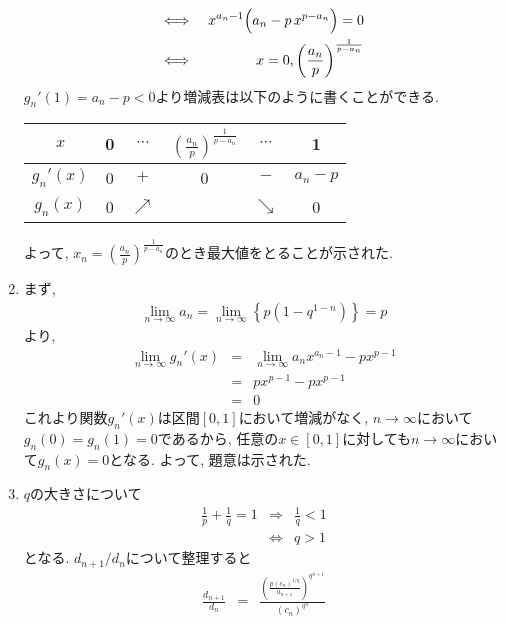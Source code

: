 \documentclass[dvipdfmx,titlepage, 11pt, a4paper]{jsarticle}%
\begin{document}
\begin{enumerate}[(1)]
\begin{eqnarray*}
		      \Longleftrightarrow\ && x^{a_{n}-1}\Bigl(a_{n}-p\,x^{p-a_{n}}\Bigr)=0\\
		      \Longleftrightarrow\ && x=0,\left(\frac{a_{n}}{p}\right)^{\frac{1}{p-a_{n}}}
	      \end{eqnarray*}
	      $g_{n}'(1)=a_{n}-p<0$より増減表は以下のように書くことができる.
	      \begin{center}
		      \begin{tabular}{|c|c||c|c|c|c|}\hline
			      $x$         & 0 & $\cdots$   & $\displaystyle \left(\frac{a_{n}}{p}\right)^{\frac{1}{p-a_{n}}}$ & $\cdots$   & 1         \\ \hline
			      $g_{n}'(x)$ & 0 & $+$        & 0                                                                & $-$        & $a_{n}-p$ \\ \hline
			      $g_{n}(x)$  & 0 & $\nearrow$ &                                                                  & $\searrow$ & 0         \\ \hline
		      \end{tabular}
	      \end{center}
	      よって, $x_{n}=\displaystyle \left(\frac{a_{n}}{p}\right)^{\frac{1}{p-a_{n}}}$のとき最大値をとることが示された.
	\item まず,
	      \begin{eqnarray*}
		      \lim_{n\to \infty}a_{n}=\lim_{n\to \infty}\left\{p(1-q^{1-n})\right\}=p
	      \end{eqnarray*}
	      より,
	      \begin{eqnarray*}
		      \lim_{n\to \infty}g_{n}'(x) &=& \lim_{n\to \infty}a_{n}x^{a_{n}-1}-px^{p-1}\\
		      &=& px^{p-1}-px^{p-1}\\
		      &=&0
	      \end{eqnarray*}
	      これより関数$g_{n}'(x)$は区間$[0,1]$において増減がなく, $n\to \infty$において$g_{n}(0)=g_{n}(1)=0$であるから, 任意の$x\in[0,1]$に対しても$n\to \infty$において$g_{n}(x)=0$となる. よって, 題意は示された.
	\item $q$の大きさについて
	      \begin{eqnarray*}
		      \frac{1}{p}+\frac{1}{q}=1&\Longrightarrow& \frac{1}{q}<1\\
		      &\Longleftrightarrow& q>1
	      \end{eqnarray*}
	      となる. $d_{n+1}/d_{n}$について整理すると
	      \begin{eqnarray*}
		      \frac{d_{n+1}}{d_{n}}&=&\frac{\displaystyle \left(\frac{p(c_{n})^{1/q}}{a_{n+1}}\right)^{q^{n+1}}}{(c_{n})^{q^{n}}}\\

\end{eqnarray*}
\end{enumerate}
\end{document}
